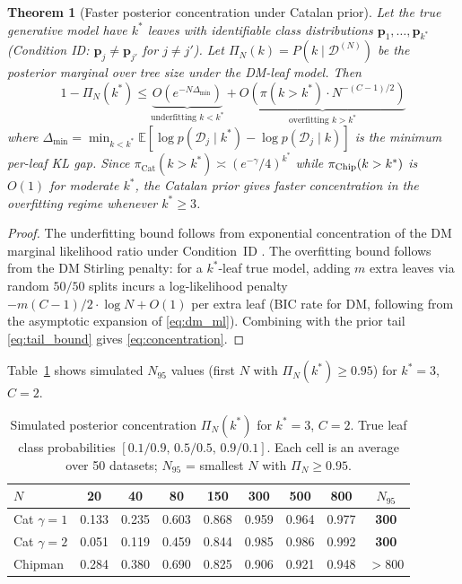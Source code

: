 \documentclass[ba]{imsart}
\theoremstyle{plain}
\newtheorem{theorem}{Theorem}[section]
\theoremstyle{definition}
\theoremstyle{remark}
\newcommand{\Eop}{\mathbb{E}}
\newcommand{\Cat}{\mathrm{Cat}}
\begin{document}
\begin{theorem}[Faster posterior concentration under Catalan prior]
\label{thm:posterior_concentration}
  Let the true generative model have $k^*$ leaves with identifiable class
  distributions $\boldsymbol{p}_1,\ldots,\boldsymbol{p}_{k^*}$
  (Condition ID: $\boldsymbol{p}_j \neq \boldsymbol{p}_{j'}$ for $j\neq j'$).
  Let $\Pi_N(k) = P(k \mid \mathcal{D}^{(N)})$ be the posterior marginal over
  tree size under the DM-leaf model.
  Then
  \begin{equation}
    1 - \Pi_N(k^*) \leq
    \underbrace{O\!\left(e^{-N\Delta_{\min}}\right)}_{\text{underfitting } k < k^*}
    +
    \underbrace{O\!\left(\pi(k > k^*) \cdot N^{-(C-1)/2}\right)}_{\text{overfitting } k > k^*}
    \label{eq:concentration}
  \end{equation}
  where $\Delta_{\min} = \min_{k<k^*}\Eop[\log p(\mathcal{D}_j \mid k^*) - \log p(\mathcal{D}_j \mid k)]$
  is the minimum per-leaf KL gap.
  Since $\pi_{\Cat}(k > k^*) \asymp (e^{-\gamma}/4)^{k^*}$ while
  $\pi_{\rm Chip}(k>k^*)$ is $O(1)$ for moderate $k^*$, the Catalan prior
  gives faster concentration in the overfitting regime whenever $k^* \geq 3$.
\end{theorem}

\begin{proof}
The underfitting bound follows from exponential concentration of the DM
marginal likelihood ratio under Condition~ID \citep{walker2001}.
The overfitting bound follows from the DM Stirling penalty:
for a $k^*$-leaf true model, adding $m$ extra leaves via random $50/50$ splits
incurs a log-likelihood penalty $-m(C-1)/2 \cdot \log N + O(1)$
per extra leaf (BIC rate for DM, following from the asymptotic expansion
of \eqref{eq:dm_ml}).
Combining with the prior tail \eqref{eq:tail_bound} gives \eqref{eq:concentration}.
\end{proof}

Table~\ref{tab:concentration} shows simulated $N_{95}$ values
(first $N$ with $\Pi_N(k^*) \geq 0.95$) for $k^*=3$, $C=2$.

\begin{table}[t]
\centering
\caption{Simulated posterior concentration $\Pi_N(k^*)$ for $k^*=3$, $C=2$.
         True leaf class probabilities $[0.1/0.9,\,0.5/0.5,\,0.9/0.1]$.
         Each cell is an average over 50 datasets; $N_{95}$ = smallest $N$ with $\Pi_N \geq 0.95$.}
\label{tab:concentration}
\begin{tabular}{lcccccccc}
\toprule
$N$       & 20    & 40    & 80    & 150   & 300   & 500   & 800   & $N_{95}$ \\
\midrule
Cat $\gamma=1$ & 0.133 & 0.235 & 0.603 & 0.868 & 0.959 & 0.964 & 0.977 & \textbf{300} \\
Cat $\gamma=2$ & 0.051 & 0.119 & 0.459 & 0.844 & 0.985 & 0.986 & 0.992 & \textbf{300} \\
Chipman        & 0.284 & 0.380 & 0.690 & 0.825 & 0.906 & 0.921 & 0.948 & ${>}800$ \\
\bottomrule
\end{tabular}
\end{table}
\end{document}

